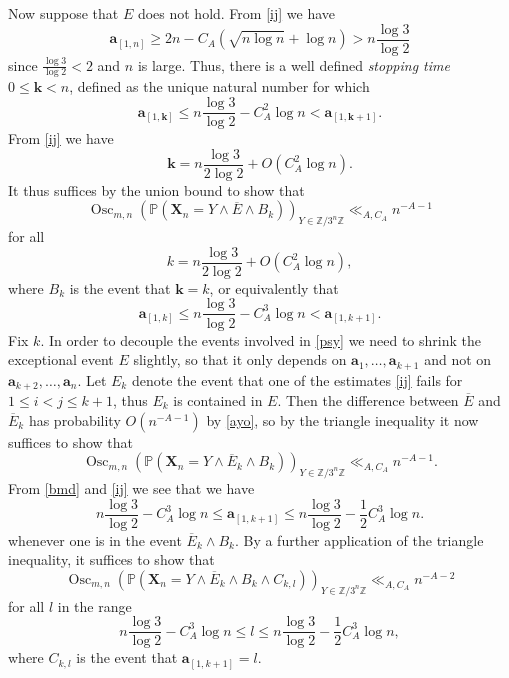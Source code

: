 \documentclass[12pt,a4paper,reqno]{amsart}
\numberwithin{equation}{section}
\theoremstyle{plain}
\theoremstyle{definition}
\renewcommand\P{\mathbb{P}}
\newcommand\Z{\mathbb{Z}}
\renewcommand\a{\mathbf{a}}
\renewcommand\k{\mathbf{k}}
\newcommand\X{\mathbf{X}}
\newcommand\Osc{{\operatorname{Osc}}}
\begin{document}
Now suppose that $E$ does not hold.  From \eqref{ij} we have
$$ \a_{[1,n]} \geq 2n - C_A (\sqrt{n \log n} + \log n) > n \frac{\log 3}{\log 2}$$
since $\frac{\log 3}{\log 2} < 2$ and $n$ is large.
Thus, there is a well defined \emph{stopping time} $0 \leq \k < n$, defined as the unique natural number for which
$$ \a_{[1,\k]} \leq n \frac{\log 3}{\log 2} - C_A^2 \log n < \a_{[1,\k+1]}.$$
From \eqref{ij} we have
$$ \k = n \frac{\log 3}{2 \log 2} + O( C_A^2 \log n ).$$
It thus suffices by the union bound to show that
\begin{equation}\label{psy}
\Osc_{m,n}\left( \P( \X_n = Y \wedge \overline{E} \wedge B_k) \right)_{Y \in \Z/3^n\Z} \ll_{A,C_A} n^{-A-1}
\end{equation}
for all 
\begin{equation}\label{hepta}
k = n \frac{\log 3}{2 \log 2} + O( C_A^2 \log n ),
\end{equation}
where $B_k$ is the event that $\k=k$, or equivalently that
\begin{equation}\label{bmd}
 \a_{[1,k]}\leq n \frac{\log 3}{\log 2} - C_A^3 \log n < \a_{[1,k+1]}.
\end{equation}
Fix $k$.  In order to decouple the events involved in \eqref{psy} we need to shrink the exceptional event $E$ slightly, so that it only depends on $\a_1,\dots,\a_{k+1}$ and not on $\a_{k+2},\dots,\a_n$.  Let $E_k$ denote the event that one of the estimates \eqref{ij} fails for $1 \leq i < j \leq k+1$, thus $E_k$ is contained in $E$.   Then the difference between $\overline{E}$ and $\overline{E}_k$ has probability $O(n^{-A-1})$ by \eqref{ayo}, so by the triangle inequality it now suffices to show that
$$ 
\Osc_{m,n}\left( \P( \X_n = Y \wedge \overline{E}_k \wedge B_k ) \right)_{Y \in \Z/3^n\Z} \ll_{A,C_A} n^{-A-1}.$$
From \eqref{bmd} and \eqref{ij} we see that we have
\begin{equation}\label{bmd-2}
n \frac{\log 3}{\log 2} - C_A^3 \log n \leq  \a_{[1,k+1]} \leq n \frac{\log 3}{\log 2} - \frac{1}{2} C_A^3 \log n.
\end{equation}
whenever one is in the event $\overline{E}_k \wedge B_k$.  By a further application of the triangle inequality, it suffices to show that
$$
\Osc_{m,n}\left( \P( \X_n = Y \wedge \overline{E}_k \wedge B_k \wedge C_{k,l} ) \right)_{Y \in \Z/3^n\Z} \ll_{A,C_A} n^{-A-2}
$$
for all $l$ in the range
\begin{equation}\label{bmd-3}
 n \frac{\log 3}{\log 2} - C_A^3 \log n \leq  l \leq n \frac{\log 3}{\log 2} - \frac{1}{2} C_A^3 \log n,
\end{equation}
where $C_{k,l}$ is the event that $\a_{[1,k+1]}=l$.
\end{document}
